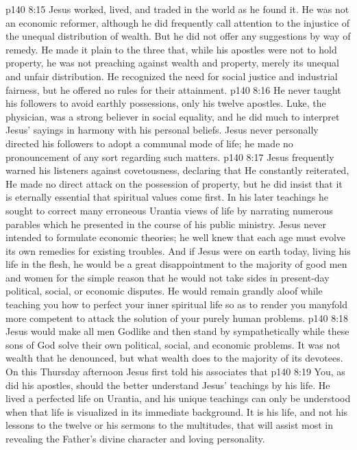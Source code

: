 \vs p140 8:15 \bibnobreakspace {} Jesus worked, lived, and traded in the world as he found it. He was not an economic reformer, although he did frequently call attention to the injustice of the unequal distribution of wealth. But he did not offer any suggestions by way of remedy. He made it plain to the three that, while his apostles were not to hold property, he was not preaching against wealth and property, merely its unequal and unfair distribution. He recognized the need for social justice and industrial fairness, but he offered no rules for their attainment.
\vs p140 8:16 He never taught his followers to avoid earthly possessions, only his twelve apostles. Luke, the physician, was a strong believer in social equality, and he did much to interpret Jesus’ sayings in harmony with his personal beliefs. Jesus never personally directed his followers to adopt a communal mode of life; he made no pronouncement of any sort regarding such matters.
\vs p140 8:17 Jesus frequently warned his listeners against covetousness, declaring that  He constantly reiterated,  He made no direct attack on the possession of property, but he did insist that it is eternally essential that spiritual values come first. In his later teachings he sought to correct many erroneous Urantia views of life by narrating numerous parables which he presented in the course of his public ministry. Jesus never intended to formulate economic theories; he well knew that each age must evolve its own remedies for existing troubles. And if Jesus were on earth today, living his life in the flesh, he would be a great disappointment to the majority of good men and women for the simple reason that he would not take sides in present\hyp{}day political, social, or economic disputes. He would remain grandly aloof while teaching you how to perfect your inner spiritual life so as to render you manyfold more competent to attack the solution of your purely human problems.
\vs p140 8:18 \pc Jesus would make all men Godlike and then stand by sympathetically while these sons of God solve their own political, social, and economic problems. It was not wealth that he denounced, but what wealth does to the majority of its devotees. On this Thursday afternoon Jesus first told his associates that 
\vs p140 8:19 \bibnobreakspace {} You, as did his apostles, should the better understand Jesus’ teachings by his life. He lived a perfected life on Urantia, and his unique teachings can only be understood when that life is visualized in its immediate background. It is his life, and not his lessons to the twelve or his sermons to the multitudes, that will assist most in revealing the Father’s divine character and loving personality.
